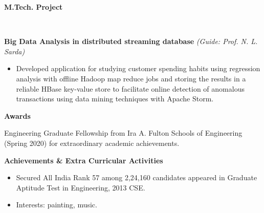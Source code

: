 \documentclass[a4paper,11pt]{article}
\newcommand{\lsep}{-0.5cm}
\newcommand{\resheading}[1]{{\small \colorbox{mygrey}{\begin{minipage}{0.975\textwidth}{\textbf{#1 \vphantom{p\^{E}}}}\end{minipage}}}}
\begin{document}
	\resheading{\textbf{\large M.Tech. Project} }\\[\lsep]
	\begin{description}
		\item \hspace{0.65 cm} \textbf{Big Data Analysis in distributed streaming database}
		\hfill\textit{(Guide: Prof. N. L. Sarda)}
		\begin{itemize}
			\item Developed application for studying customer spending habits using regression analysis with offline Hadoop map reduce jobs and storing the results in a reliable HBase key-value store to facilitate online detection of anomalous transactions using data mining techniques with Apache Storm. 
			
			
		\end{itemize}
		
	\end{description}
	
	
	\resheading{\textbf{\large Awards}}
	\begin{description}
		\item \hspace{0.65 cm} Engineering Graduate Fellowship from Ira A. Fulton Schools of Engineering (Spring 2020) for extraordinary academic achievements.
		
	\end{description}
	
	\resheading{\textbf{\large Achievements \& Extra Curricular Activities }}
	
	\begin{description}
		\item
		\begin{itemize}
			\item Secured All India Rank 57 among 2,24,160 candidates appeared in Graduate Aptitude Test in Engineering, 2013 CSE.
		\end{itemize}
		\item
		\begin{itemize}
			\item Interests: painting, music.
		\end{itemize}
	\end{description}
	
\end{document}
